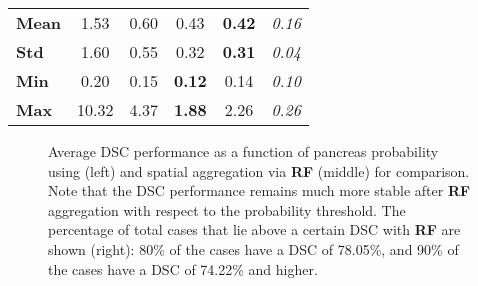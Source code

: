 \documentclass[journal]{IEEEtran}
\begin{document}
\begin{table}[htb]
\begin{subtable}[center]{0.95\columnwidth}
\begin{tabular}{l|c|c|c|c|c}
		\midrule    
\textbf{Mean}	&1.53	&0.60    	&0.43 &\textbf{0.42}&\textit{0.16}\\
\textbf{Std}      &1.60	&0.55		&0.32 &\textbf{0.31}&\textit{0.04}\\
\textbf{Min}	&0.20	&0.15	&\textbf{0.12} &0.14&\textit{0.10}	\\
\textbf{Max}	&10.32	&4.37		&\textbf{1.88} &2.26&\textit{0.26}\\
    \bottomrule
		\bottomrule
    \end{tabular}\end{subtable}
\label{tab:results}\end{table}\begin{figure*}[htb]\centering	{}
	\caption{\small Average DSC performance as a function of pancreas probability using  (left) and spatial aggregation via \textbf{RF} (middle) for comparison. Note that the DSC performance remains much more stable after \textbf{RF} aggregation with respect to the probability threshold. The percentage of total cases that lie  above a certain DSC with \textbf{RF} are shown (right): 80\% of the cases have a DSC of 78.05\%, and 90\% of the cases have a DSC of 74.22\% and higher.}
	\label{fig:avg_dsc}
\end{figure*}
\end{document}
